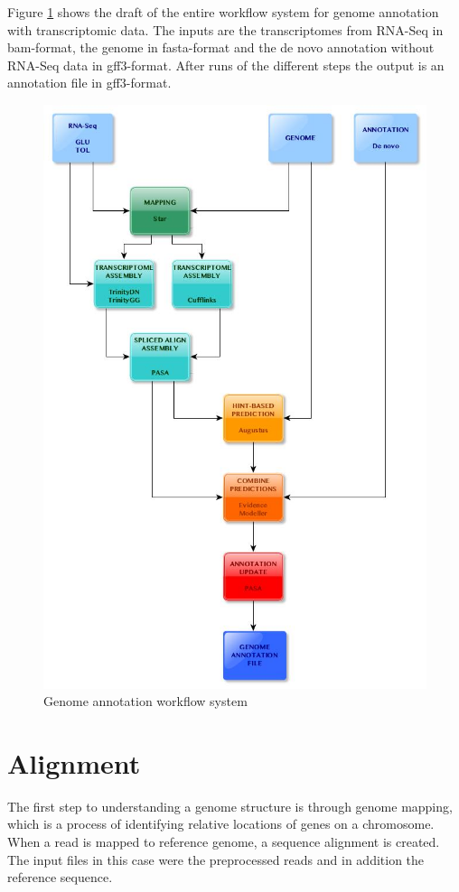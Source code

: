 \documentclass[11pt, a4paper]{report}
\begin{document}
Figure \ref{fig:pipeline} shows the draft of the entire workflow system for genome annotation with transcriptomic data. The inputs are the transcriptomes from RNA-Seq in bam-format, the genome in fasta-format and the de novo annotation without RNA-Seq data in gff3-format. After runs of the different steps the output is an annotation file in gff3-format.
\begin{figure}[H]
\centering	
\includegraphics[width=360pt]{pipeline}
\caption[Genome Annotation Workflow]
{Genome annotation workflow system}
\label{fig:pipeline}
\end{figure}

\section{Alignment}
The first step to understanding a genome structure is through genome mapping, which is a process of identifying relative locations of genes on a chromosome. When a read is mapped to reference genome, a sequence alignment is created. \cite{Xiong2006} The input files in this case were the preprocessed reads and in addition the reference sequence. 
\end{document}
